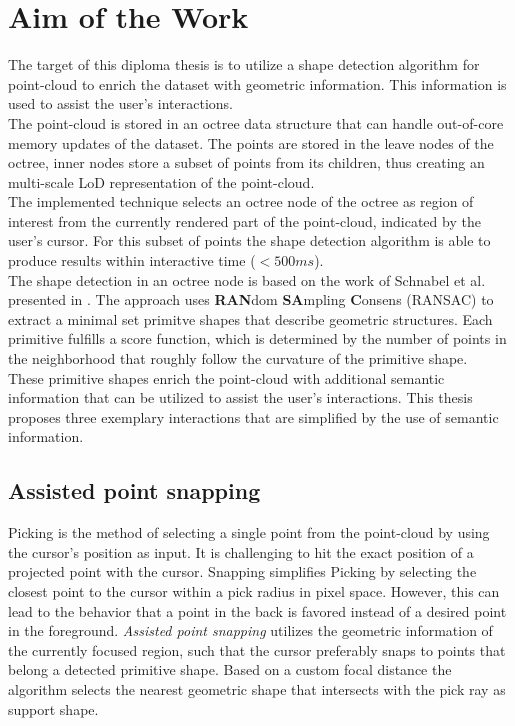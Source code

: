 \section{Aim of the Work}
\label{sec:aim}
The target of this diploma thesis is to utilize a shape detection algorithm for point-cloud to enrich the dataset with geometric information. This information is used to assist the user's interactions.
\\
The point-cloud is stored in an octree data structure that can handle out-of-core memory updates of the dataset. The points are stored in the leave nodes of the octree, inner nodes store a subset of points from its children, thus creating an multi-scale LoD representation of the point-cloud.
\\
The implemented technique selects an octree node of the octree as region of interest from the currently rendered part of the point-cloud, indicated by the user's cursor. For this subset of points the shape detection algorithm is able to produce results within interactive time ($<500ms$).
\\
The shape detection in an octree node is based on the work of Schnabel et al. presented in \cite{schnabel-2007-efficient}. The approach uses \textbf{RAN}dom \textbf{SA}mpling \textbf{C}onsens (RANSAC) \cite{fischler1981random} to extract a minimal set primitve shapes that describe geometric structures. Each primitive fulfills a score function, which is determined by the number of points in the neighborhood that roughly follow the curvature of the primitive shape.
\\
These primitive shapes enrich the point-cloud with additional semantic information that can be utilized to assist the user's interactions. This thesis proposes three exemplary interactions that are simplified by the use of semantic information. 
\\
\subsection{Assisted point snapping}
Picking is the method of selecting a single point from the point-cloud by using the cursor's position as input. It is challenging to hit the exact position of a projected point with the cursor. Snapping simplifies Picking by selecting the closest point to the cursor within a pick radius in pixel space. However, this can lead to the behavior that a point in the back is favored instead of a desired point in the foreground. 
\textit{Assisted point snapping} utilizes the geometric information of the currently focused region, such that the cursor preferably snaps to points that belong a detected primitive shape. Based on a custom focal distance the algorithm selects the nearest geometric shape that intersects with the pick ray as support shape. 
\\
